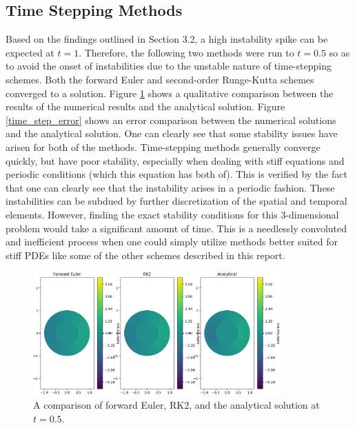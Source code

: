\documentclass{homework}
\begin{document}
\subsection{Time Stepping Methods}
Based on the findings outlined in Section 3.2, a high instability spike can be expected at $t = 1$. Therefore, the following two methods were run to $t = 0.5$ so as to avoid the onset of instabilities due to the unstable nature of time-stepping schemes.
\newpage  \noindent
Both the forward Euler and second-order Runge-Kutta schemes converged to a solution. Figure \ref{time_step_results} shows a qualitative comparison between the results of the numerical results and the analytical solution.
\noindent
Figure \ref{time_step_error} shows an error comparison between the numerical solutions and the analytical solution. One can clearly see that some stability issues have arisen for both of the methods. Time-stepping methods generally converge quickly, but have poor stability, especially when dealing with stiff equations and periodic conditions (which this equation has both of). This is verified by the fact that one can clearly see that the instability arises in a periodic fashion. These instabilities can be subdued by further discretization of the spatial and temporal elements. However, finding the exact stability conditions for this 3-dimensional problem would take a significant amount of time. This is a needlessly convoluted and inefficient process when one could simply utilize methods better suited for stiff PDEs like some of the other schemes described in this report.
\begin{figure}[H]
    \centering
    \includegraphics[width = 0.85\textwidth]{media/time_step_compare.png}
    \caption{A comparison of forward Euler, RK2, and the analytical solution at $t=0.5$.}
\label{time_step_results}\end{figure}
\end{document}
